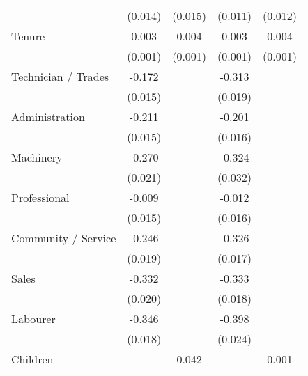 {\begin{tabular}{l*{4}{c}}
                    &     (0.014)         &     (0.015)         &     (0.011)         &     (0.012)         \\
Tenure              &       0.003\sym{***}&       0.004\sym{***}&       0.003\sym{***}&       0.004\sym{***}\\
                    &     (0.001)         &     (0.001)         &     (0.001)         &     (0.001)         \\
Technician / Trades &      -0.172\sym{***}&                     &      -0.313\sym{***}&                     \\
                    &     (0.015)         &                     &     (0.019)         &                     \\
Administration      &      -0.211\sym{***}&                     &      -0.201\sym{***}&                     \\
                    &     (0.015)         &                     &     (0.016)         &                     \\
Machinery           &      -0.270\sym{***}&                     &      -0.324\sym{***}&                     \\
                    &     (0.021)         &                     &     (0.032)         &                     \\
Professional        &      -0.009         &                     &      -0.012         &                     \\
                    &     (0.015)         &                     &     (0.016)         &                     \\
Community / Service &      -0.246\sym{***}&                     &      -0.326\sym{***}&                     \\
                    &     (0.019)         &                     &     (0.017)         &                     \\
Sales               &      -0.332\sym{***}&                     &      -0.333\sym{***}&                     \\
                    &     (0.020)         &                     &     (0.018)         &                     \\
Labourer            &      -0.346\sym{***}&                     &      -0.398\sym{***}&                     \\
                    &     (0.018)         &                     &     (0.024)         &                     \\
Children            &                     &       0.042\sym{***}&                     &       0.001         \\

\end{tabular}}
